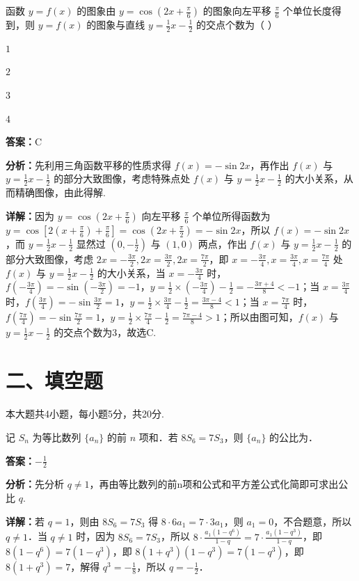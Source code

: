 \begin{question}[points=5]
函数 $y=f(x)$ 的图象由 $y=\cos\left(2x+\frac{\pi}{6}\right)$ 的图象向左平移 $\frac{\pi}{6}$ 个单位长度得到，则 $y=f(x)$ 的图象与直线 $y=\frac{1}{2}x-\frac{1}{2}$ 的交点个数为（    ）
\begin{choices}
  \item $1$
  \item $2$
  \item $3$
  \item $4$
\end{choices}
\begin{solution}
\textbf{答案：}C

\textbf{分析：}先利用三角函数平移的性质求得 $f(x)=-\sin2x$，再作出 $f(x)$ 与 $y=\frac{1}{2}x-\frac{1}{2}$ 的部分大致图像，考虑特殊点处 $f(x)$ 与 $y=\frac{1}{2}x-\frac{1}{2}$ 的大小关系，从而精确图像，由此得解.

\textbf{详解：}因为 $y=\cos\left(2x+\frac{\pi}{6}\right)$ 向左平移 $\frac{\pi}{6}$ 个单位所得函数为 $y=\cos\left[2(x+\frac{\pi}{6})+\frac{\pi}{6}\right]=\cos\left(2x+\frac{\pi}{2}\right)=-\sin2x$，所以 $f(x)=-\sin2x$，而 $y=\frac{1}{2}x-\frac{1}{2}$ 显然过 $(0,-\frac{1}{2})$ 与 $(1,0)$ 两点，作出 $f(x)$ 与 $y=\frac{1}{2}x-\frac{1}{2}$ 的部分大致图像，考虑 $2x=-\frac{3\pi}{2},2x=\frac{3\pi}{2},2x=\frac{7\pi}{2}$，即 $x=-\frac{3\pi}{4},x=\frac{3\pi}{4},x=\frac{7\pi}{4}$ 处 $f(x)$ 与 $y=\frac{1}{2}x-\frac{1}{2}$ 的大小关系，当 $x=-\frac{3\pi}{4}$ 时，$f(-\frac{3\pi}{4})=-\sin(-\frac{3\pi}{2})=-1$，$y=\frac{1}{2}\times(-\frac{3\pi}{4})-\frac{1}{2}=-\frac{3\pi+4}{8}<-1$；当 $x=\frac{3\pi}{4}$ 时，$f(\frac{3\pi}{4})=-\sin\frac{3\pi}{2}=1$，$y=\frac{1}{2}\times\frac{3\pi}{4}-\frac{1}{2}=\frac{3\pi-4}{8}<1$；当 $x=\frac{7\pi}{4}$ 时，$f(\frac{7\pi}{4})=-\sin\frac{7\pi}{2}=1$，$y=\frac{1}{2}\times\frac{7\pi}{4}-\frac{1}{2}=\frac{7\pi-4}{8}>1$；所以由图可知，$f(x)$ 与 $y=\frac{1}{2}x-\frac{1}{2}$ 的交点个数为3，故选C.
\end{solution}
\end{question}

\section*{二、填空题}
本大题共4小题，每小题5分，共20分.

\begin{question}[points=5]
记 $S_n$ 为等比数列 $\{a_n\}$ 的前 $n$ 项和．若 $8S_6=7S_3$，则 $\{a_n\}$ 的公比为．
\fillin[{$-\frac{1}{2}$}]
\begin{solution}
\textbf{答案：}$-\frac{1}{2}$

\textbf{分析：}先分析 $q\neq1$，再由等比数列的前n项和公式和平方差公式化简即可求出公比 $q$.

\textbf{详解：}若 $q=1$，则由 $8S_6=7S_3$ 得 $8\cdot6a_1=7\cdot3a_1$，则 $a_1=0$，不合题意，所以 $q\neq1$．当 $q\neq1$ 时，因为 $8S_6=7S_3$，所以 $8\cdot\frac{a_1(1-q^6)}{1-q}=7\cdot\frac{a_1(1-q^3)}{1-q}$，即 $8(1-q^6)=7(1-q^3)$，即 $8(1+q^3)(1-q^3)=7(1-q^3)$，即 $8(1+q^3)=7$，解得 $q^3=-\frac{1}{8}$，所以 $q=-\frac{1}{2}$．
\end{solution}
\end{question}

